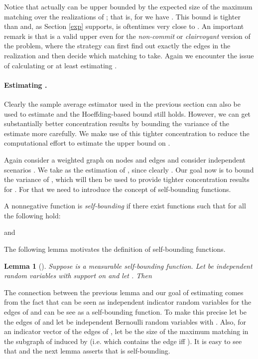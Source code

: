 \documentclass[12pt]{article}
\newtheorem{lemma}{Lemma}
\begin{document}
		Notice that actually  can be upper bounded by the expected size of the maximum matching over the realizations of ; that is, for  we have . This bound is tighter than  and, as Section \ref{exp} supports, is oftentimes very close to . An important remark is that  is a valid upper even for the \emph{non-commit} or \emph{clairvoyant} version of the problem, where the strategy can first find out exactly the edges in the realization and then decide which matching to take. Again we encounter the issue of calculating or at least estimating . 
		
		\paragraph{Estimating .} Clearly the sample average estimator used in the previous section can also be used to estimate  and the Hoeffding-based bound still holds. However, we can get substantially better concentration results by bounding the variance of the estimate more carefully. We make use of this tighter concentration to reduce the computational effort to estimate the upper bound on .
		
		Again consider a weighted graph  on  nodes and  edges and consider  independent scenarios . We take  as the estimation of , since clearly . Our goal now is to bound the variance of , which will then be used to provide tighter concentration results for . For that we need to introduce the concept of self-bounding functions. 
		
		A nonnegative function  is \emph{self-bounding} if there exist functions  such that for all  the following hold:

		and


		The following lemma motivates the definition of self-bounding functions.
		
		\begin{lemma}[\cite{BoucheronLB03}] \label{selfBoundingVar}
			Suppose  is a measurable self-bounding function. Let  be independent random variables with support on  and let . Then 
		\end{lemma}

		The connection between the previous lemma and our goal of estimating  comes from the fact that  can be seen as  independent indicator random variables for the edges of  and  can be see as a self-bounding function. To make this precise let  be the edges of  and let  be independent Bernoulli random variables with . Also, for an indicator vector  of the edges of , let  be the size of the maximum matching in the subgraph of  induced by  (i.e. which contains the edge  iff ). It is easy to see that  and the next lemma asserts that  is self-bounding.
		
\end{document}
